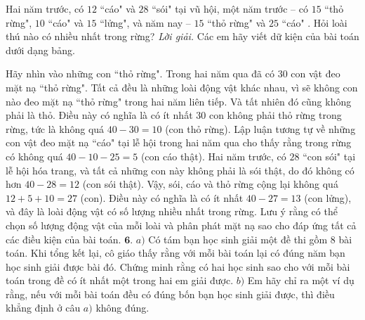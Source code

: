 \begin{multicols}{2}
\begin{figure}[H]
		\vspace*{-20pt}
	\end{figure}
	Hai năm trước, có $12$ ``cáo" và $28$ ``sói" tại vũ hội, một năm trước -- có $15$ ``thỏ rừng", $10$ ``cáo" và $15$ ``lửng", và năm nay -- $15$ ``thỏ rừng" và $25$ ``cáo" . Hỏi loài thú nào có nhiều nhất trong rừng? 
	\vskip 0.1cm
	\textit{Lời giải.} Các em hãy viết dữ kiện của bài toán dưới dạng bảng.
	\begin{table}[H]
		\renewcommand{\arraystretch}{1.2}
	\end{table}
	Hãy nhìn vào những con ``thỏ rừng". Trong hai năm qua đã có $30$ con vật đeo mặt nạ ``thỏ rừng". Tất cả đều là những loài động vật khác nhau, vì sẽ không con nào đeo mặt nạ ``thỏ rừng" trong hai năm liên tiếp. Và tất nhiên đó cũng không phải là thỏ. Điều này có nghĩa là có ít nhất $30$ con không phải thỏ rừng trong rừng, tức là không quá $40 - 30 = 10$ (con thỏ rừng). Lập luận tương tự về những con vật đeo mặt nạ ``cáo" tại lễ hội trong hai năm qua cho thấy rằng trong rừng có không quá $40 - 10 - 25 = 5$ (con cáo thật). Hai năm trước, có $28$ ``con sói" tại lễ hội hóa trang, và tất cả những con này không phải là sói thật, do đó không có hơn $40 - 28 = 12$ (con sói thật). Vậy, sói, cáo và thỏ rừng cộng lại không quá $12 + 5 + 10 = 27$ (con). Điều này có nghĩa là có ít nhất $40 - 27 = 13$ (con lửng), và đây là loài động vật có số lượng nhiều nhất trong rừng.
	\vskip 0.1cm
	Lưu ý rằng có thể chọn số lượng động vật của mỗi loài và phân phát mặt nạ sao cho đáp ứng tất cả các điều kiện của bài toán.
	\vskip 0.1cm
	$\pmb{6.}$ $a)$	Có tám bạn học sinh giải một đề thi gồm $8$ bài toán. Khi tổng kết lại, cô giáo thấy rằng với mỗi bài toán lại có đúng  năm bạn học sinh giải được bài đó. Chứng minh rằng có hai học sinh sao cho với mỗi bài toán trong đề có ít nhất một trong hai em giải được.
	\vskip 0.1cm
	$b)$	Em hãy chỉ ra một ví dụ rằng, nếu với mỗi bài toán đều có đúng bốn bạn học sinh giải được, thì điều khẳng định ở câu $a)$ không đúng.

\end{multicols}
